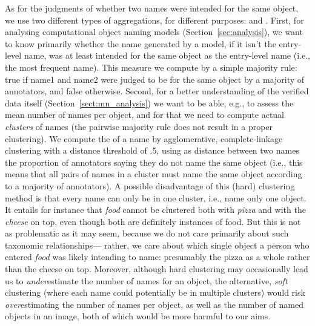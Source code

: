 As for the judgments of whether two names were intended for the same object, we use two different types of aggregations, for different purposes: \sameobject and \cluster.
First, for analysing computational object naming models (Section~\ref{sec:analysis}), 
we want to know primarily whether the name generated by a model, if it isn't the entry-level name, was at least intended for the same object as the entry-level name (i.e., the most frequent name).
This \textbf{\sameobject} measure we compute by a simple majority rule: true if name1 and name2 were judged to be for the same object by a majority of annotators, and false otherwise.
Second, for a better understanding of the verified \mn data itself (Section~\ref{sect:mn_analysis}) we want to be able, e.g., to assess the mean number of names per object, and for that we need to compute actual \emph{clusters} of names (the pairwise majority rule does not result in a proper clustering). 
We compute the \textbf{\cluster} of a name by agglomerative, complete-linkage clustering with a distance threshold of .5, using as distance between two names the proportion of annotators saying they do not name the same object (i.e., this means that all pairs of names in a cluster must name the same object according to a majority of annotators).
A possible disadvantage of this (hard) clustering method is that every name can only be in one cluster, i.e., name only one object.
It entails for instance that \emph{food} cannot be clustered both with \emph{pizza} and with the \emph{cheese} on top, even though both are definitely instances of food.
But this is not as problematic as it may seem, because we do not care primarily about such taxonomic relationships--- %
rather, we care about %
which single object a person who entered \emph{food} was likely intending to name: presumably the pizza as a whole rather than the cheese on top. 
Moreover, although hard clustering may occasionally lead us to \emph{under}estimate the number of names for an object, the alternative, \emph{soft} clustering (where each name could potentially be in multiple clusters) would risk \emph{over}estimating the number of names per object, as well as the number of named objects in an image, both of which would be more harmful to our aims.

